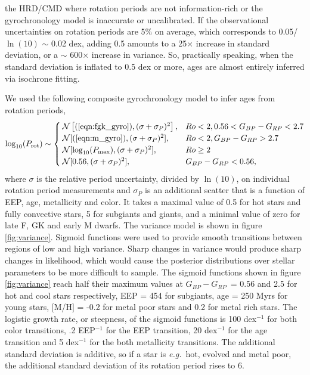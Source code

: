 \documentclass[useAMS, usenatbib, preprint, 12pt]{aastex}
\newcommand{\eg}{{\it e.g.}}
\newcommand{\gcolor}{$G_{BP} - G_{RP}$}
\begin{document}
the HRD/CMD where rotation periods are not information-rich or the
gyrochronology model is inaccurate or uncalibrated.
If the observational uncertainties on rotation periods are 5\% on average,
which corresponds to 0.05/$\ln(10)$ $\sim$ 0.02 dex, adding 0.5 amounts to
a 25$\times$ increase in standard deviation, or a $\sim$ 600$\times$ increase
in variance.
So, practically speaking, when the standard deviation is inflated to 0.5 dex
or more, ages are almost entirely inferred via isochrone fitting.


We used the following composite gyrochronology model to infer ages from
rotation periods,
\begin{equation}
    \log_{10}(P_\mathrm{rot}) \sim \begin{cases}
        \mathcal{N}\left[(\ref{eqn:fgk_gyro}), (\sigma+\sigma_P)^2\right], & Ro < 2,
        0.56 < G_{BP} - G_{RP} < 2.7 \\
        \mathcal{N}[(\ref{eqn:m_gyro}), (\sigma+\sigma_P)^2], & Ro < 2,
        G_{BP} - G_{RP} > 2.7 \\
        \mathcal{N}[\log_{10}(P_\mathrm{max}), (\sigma+\sigma_P)^2],& Ro \geq 2 \\
        \mathcal{N}[0.56, (\sigma+\sigma_P)^2],& G_{BP} - G_{RP} < 0.56,
    \end{cases}
\label{eqn:gyro}
\end{equation}
where $\sigma$ is the relative period uncertainty, divided by $\ln(10)$, on
individual rotation period measurements and $\sigma_P$ is an additional
scatter that is a function of EEP, age, metallicity and color.
It takes a maximal value of 0.5 for hot stars and fully convective stars, 5
for subgiants and giants, and a minimal value of zero for late F, GK and early
M dwarfs.
The variance model is shown in figure \ref{fig:variance}.
Sigmoid functions were used to provide smooth transitions between regions of
low and high variance.
Sharp changes in variance would produce sharp changes in likelihood, which
would cause the posterior distributions over stellar parameters to be more
difficult to sample.
The sigmoid functions shown in figure \ref{fig:variance} reach half their
maximum values at \gcolor\ = 0.56 and 2.5 for hot and cool stars respectively,
EEP = 454 for subgiants, age = 250 Myrs for young stars, $[$M/H$]$ = -0.2 for
metal poor stars and 0.2 for metal rich stars.
The logistic growth rate, or steepness, of the sigmoid functions is 100
dex$^{-1}$ for both color transitions, .2 EEP$^{-1}$ for the EEP transition,
20 dex$^{-1}$ for the age transition and 5 dex$^{-1}$ for the both metallicity
transitions.
The additional standard deviation is additive, so if a star is \eg\ hot,
evolved and metal poor, the additional standard deviation of its rotation
period rises to 6.
\end{document}
